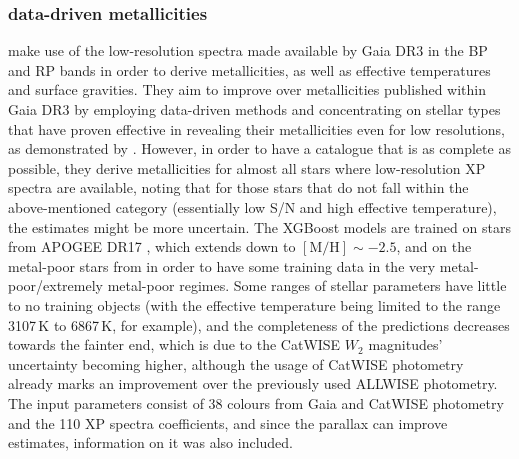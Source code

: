 \documentclass[a4paper,11pt]{article}
\begin{document}
\subsubsection*{\citet{andrae23} data-driven metallicities}
\citet{andrae23} make use of the low-resolution spectra made available by Gaia DR3 in the BP and RP bands in order to derive metallicities, as well as effective temperatures and surface gravities. They aim to improve over metallicities published within Gaia DR3 by employing data-driven methods and concentrating on stellar types that have proven effective in revealing their metallicities even for low resolutions, as demonstrated by \citet{rix22}. However, in order to have a catalogue that is as complete as possible, they derive metallicities for almost all stars where low-resolution XP spectra are available, noting that for those stars that do not fall within the above-mentioned category (essentially low S/N and high effective temperature), the estimates might be more uncertain. The XGBoost models are trained on stars from APOGEE DR17 \citep{sdss17}, which extends down to $\mathrm{[M/H]}\sim-2.5$, and on the metal-poor stars from \citet{li22} in order to have some training data in the very metal-poor/extremely metal-poor regimes. Some ranges of stellar parameters have little to no training objects (with the effective temperature being limited to the range 3107\,K to 6867\,K, for example), and the completeness of the predictions decreases towards the fainter end, which is due to the CatWISE $W_2$ magnitudes’ uncertainty becoming higher, although the usage of CatWISE photometry \citep{marocco21} already marks an improvement over the previously used ALLWISE photometry. The input parameters consist of 38 colours from Gaia and CatWISE photometry and the 110 XP spectra coefficients, and since the parallax can improve estimates, information on it was also included.\\ \\
%
\end{document}
